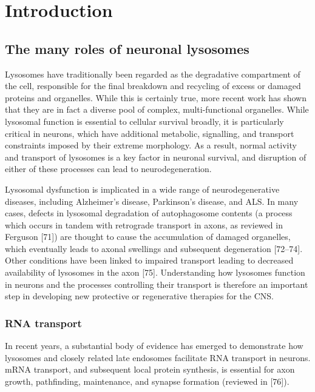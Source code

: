 \documentclass[
  12pt,
  a4paper,
]{book}
\begin{document}
\hypertarget{introduction}{%
\section{Introduction}\label{introduction}}

\hypertarget{the-many-roles-of-neuronal-lysosomes}{%
\subsection{The many roles of neuronal lysosomes}\label{the-many-roles-of-neuronal-lysosomes}}

Lysosomes have traditionally been regarded as the degradative compartment of the cell, responsible for the final breakdown and recycling of excess or damaged proteins and organelles. While this is certainly true, more recent work has shown that they are in fact a diverse pool of complex, multi-functional organelles. While lysosomal function is essential to cellular survival broadly, it is particularly critical in neurons, which have additional metabolic, signalling, and transport constraints imposed by their extreme morphology. As a result, normal activity and transport of lysosomes is a key factor in neuronal survival, and disruption of either of these processes can lead to neurodegeneration.

Lysosomal dysfunction is implicated in a wide range of neurodegenerative diseases, including Alzheimer's disease, Parkinson's disease, and ALS. In many cases, defects in lysosomal degradation of autophagosome contents (a process which occurs in tandem with retrograde transport in axons, as reviewed in Ferguson {[}71{]}) are thought to cause the accumulation of damaged organelles, which eventually leads to axonal swellings and subsequent degeneration {[}72--74{]}. Other conditions have been linked to impaired transport leading to decreased availability of lysosomes in the axon {[}75{]}. Understanding how lysosomes function in neurons and the processes controlling their transport is therefore an important step in developing new protective or regenerative therapies for the CNS.

\hypertarget{rna-transport}{%
\subsubsection{RNA transport}\label{rna-transport}}

In recent years, a substantial body of evidence has emerged to demonstrate how lysosomes and closely related late endosomes facilitate RNA transport in neurons. mRNA transport, and subsequent local protein synthesis, is essential for axon growth, pathfinding, maintenance, and synapse formation (reviewed in {[}76{]}).
\end{document}
